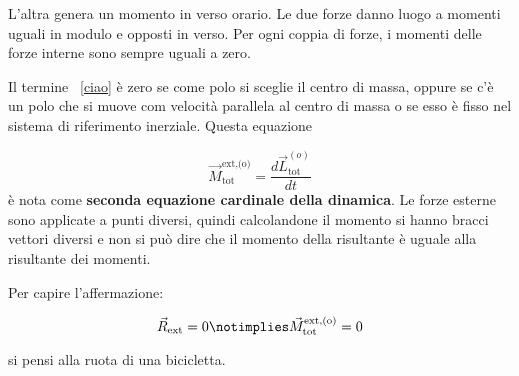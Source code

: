 \begin{figure}[htpb]
\end{figure}
\FloatBarrier
L'altra genera un momento in verso orario. Le due forze danno luogo a momenti uguali in modulo e opposti in verso. Per ogni coppia di forze, i momenti delle forze interne sono sempre uguali a zero.

Il termine ~\eqref{ciao} è zero se come polo si sceglie il centro di massa, oppure se c'è un polo che si muove com velocità parallela al centro di massa o se esso è fisso nel sistema di riferimento inerziale. Questa equazione

\[
	\boxed{\vec{M}_\text{tot}^\text{ext,(o)}=\frac{d\vec{L}_\text{tot}^{(o)}}{dt}}
\]
è nota come \textbf{seconda equazione cardinale della dinamica}. Le forze esterne sono applicate a punti diversi, quindi calcolandone il momento si hanno bracci vettori diversi e non si può dire che il momento della risultante è uguale alla risultante dei momenti.

Per capire l'affermazione:

\[
	\vec{R}_\text{ext}=0 \notimplies \vec{M}_\text{tot}^\text{ext,(o)}=0
\]

si pensi alla ruota di una bicicletta.

